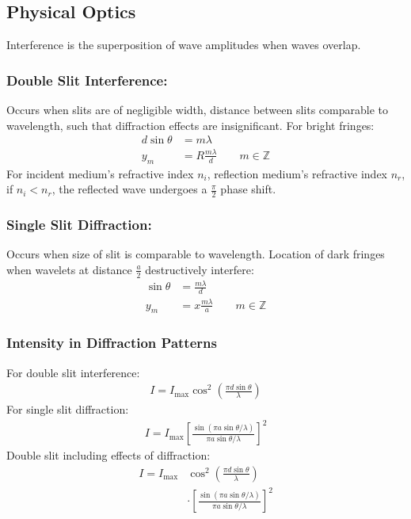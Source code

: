 \documentclass[11pt]{article}
\begin{document}
\begin{multicols*}{3}
\subsection{Physical Optics}
Interference is the superposition of wave amplitudes when waves overlap.
\subsubsection*{Double Slit Interference:}
Occurs when slits are of negligible width, distance between slits comparable to wavelength, such that diffraction effects are insignificant. For bright fringes:
	\begin{align*}
	d\sin{\theta}&=m\lambda \\
	y_m&=R\frac{m\lambda}{d} \qquad m \in \mathbb{Z}
	\end{align*}
For incident medium's refractive index $n_i$, reflection medium's refractive index $n_r$, if $n_i < n_r$, the reflected wave undergoes a $\frac{\pi}{2}$ phase shift.
\subsubsection*{Single Slit Diffraction:}
Occurs when size of slit is comparable to wavelength. Location of dark fringes when wavelets at distance $\frac{a}{2}$ destructively interfere:
	\begin{align*}
	\sin{\theta}&=\frac{m\lambda}{d} \\
	y_m&=x\frac{m\lambda}{a} \qquad m \in \mathbb{Z}
	\end{align*}
\subsubsection*{Intensity in Diffraction Patterns}
For double slit interference:
	\begin{align*}
	I = I_{\text{max}} \cos^2\left(\frac{\pi d \sin{\theta}}{\lambda} \right)
	\end{align*}
For single slit diffraction:
	\begin{align*}
	I = I_{\text{max}} \left [\frac{\sin(\pi a \sin \theta / \lambda)}{\pi a \sin \theta / \lambda} \right]^2
	\end{align*}
Double slit including effects of diffraction:
	\begin{align*}
	I = I_{\text{max}} &\cos^2\left(\frac{\pi d \sin{\theta}}{\lambda} \right) \\
	&\cdot  \left [\frac{\sin(\pi a \sin \theta / \lambda)}{\pi a \sin \theta / \lambda} \right]^2
	\end{align*}
\end{multicols*}
\end{document}
